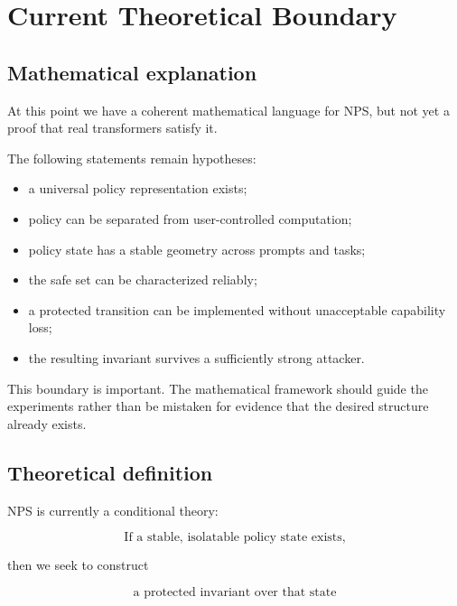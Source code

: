 \documentclass[11pt]{article}
\begin{document}
\section{Current Theoretical Boundary}

\subsection*{Mathematical explanation}

At this point we have a coherent mathematical language for NPS, but not yet
a proof that real transformers satisfy it.

The following statements remain hypotheses:

\begin{itemize}
    \item a universal policy representation exists;
    \item policy can be separated from user-controlled computation;
    \item policy state has a stable geometry across prompts and tasks;
    \item the safe set can be characterized reliably;
    \item a protected transition can be implemented without unacceptable
          capability loss;
    \item the resulting invariant survives a sufficiently strong attacker.
\end{itemize}

This boundary is important. The mathematical framework should guide the
experiments rather than be mistaken for evidence that the desired structure
already exists.

\subsection*{Theoretical definition}

NPS is currently a conditional theory:

\begin{equation}
\boxed{
\text{If a stable, isolatable policy state exists,}
}
\end{equation}

then we seek to construct

\begin{equation}
\boxed{
\text{a protected invariant over that state}
}
\end{equation}
\end{document}
